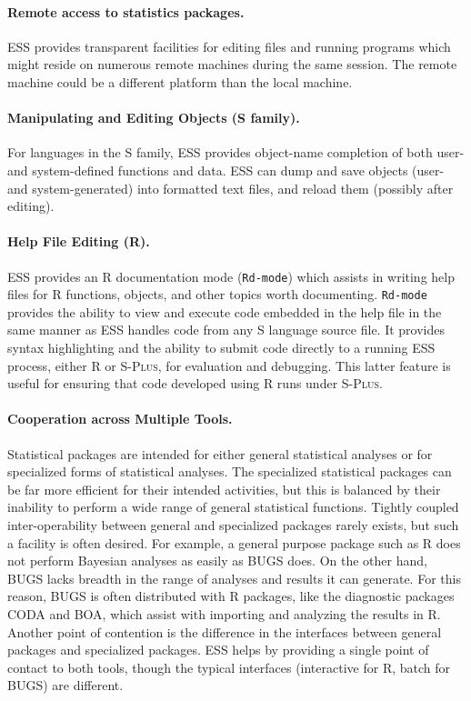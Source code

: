 \documentclass{article}
\newcommand*{\Splus}{\textsc{S-Plus}}
\newcommand{\stexttt}[1]{{\small\texttt{#1}}}
\begin{document}
\paragraph{Remote access to statistics packages.}
ESS provides transparent facilities for editing files and running
programs which might reside on numerous remote machines during the
same session.  The remote machine could be a different platform than
the local machine.

\paragraph{Manipulating and Editing Objects (S family).}
For languages in the S family, ESS provides object-name completion of
both user- and system-defined functions and data.  ESS can dump and
save objects (user- and system-generated) into formatted text files,
and reload them (possibly after editing).

\paragraph{Help File Editing (R).}
ESS provides an R documentation mode (\stexttt{Rd-mode}) which assists
in writing help files for R functions, objects, and other topics worth
documenting.  \stexttt{Rd-mode} provides the ability to view and
execute code embedded in the help file in the same manner as ESS
handles code from any S language source file.  It provides syntax
highlighting and the ability to submit code directly to a running ESS
process, either R or \Splus, for evaluation and debugging.  This
latter feature is useful for ensuring that code developed using R runs
under \Splus.

\paragraph{Cooperation across Multiple Tools.}
Statistical packages are intended for either general statistical
analyses or for specialized forms of statistical analyses.  The
specialized statistical packages can be far more efficient for their
intended activities, but this is balanced by their inability to
perform a wide range of general statistical functions.  Tightly
coupled inter-operability between general and specialized packages
rarely exists, but such a facility is often desired.  For example, a
general purpose package such as R does not perform Bayesian analyses
as easily as BUGS does.  On the other hand, BUGS lacks breadth in the
range of analyses and results it can generate.  For this reason, BUGS
is often distributed with R packages, like the diagnostic packages
CODA and BOA, which assist with importing and analyzing the results in
R.  Another point of contention is the difference in the interfaces
between general packages and specialized packages.  ESS helps by
providing a single point of contact to both tools, though the typical
interfaces (interactive for R, batch for BUGS) are different.
\end{document}
